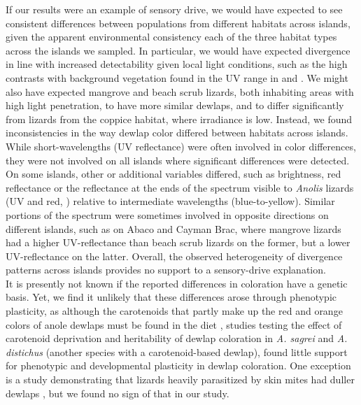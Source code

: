 If our results were an example of sensory drive, we would have expected to see consistent differences between populations from different habitats across islands, given the apparent environmental consistency each of the three habitat types across the islands we sampled. In particular, we would have expected divergence in line with increased detectability given local light conditions, such as the high contrasts with background vegetation found in the UV range in \citet{Leal2002} and \citet{Leal2004}. We might also have expected mangrove and beach scrub lizards, both inhabiting areas with high light penetration, to have more similar dewlaps, and to differ significantly from lizards from the coppice habitat, where irradiance is low. Instead, we found inconsistencies in the way dewlap color differed between habitats across islands. While short-wavelengths (UV reflectance) were often involved in color differences, they were not involved on all islands where significant differences were detected. On some islands, other or additional variables differed, such as brightness, red reflectance or the reflectance at the ends of the spectrum visible to \textit{Anolis} lizards (UV and red, \citealt{Lazareva2012}) relative to intermediate wavelengths (blue-to-yellow). Similar portions of the spectrum were sometimes involved in opposite directions on different islands, such as on Abaco and Cayman Brac, where mangrove lizards had a higher UV-reflectance than beach scrub lizards on the former, but a lower UV-reflectance on the latter. Overall, the observed heterogeneity of divergence patterns across islands provides no support to a sensory-drive explanation.\\

It is presently not known if the reported differences in coloration have a genetic basis. Yet, we find it unlikely that these differences arose through phenotypic plasticity, as although the carotenoids that partly make up the red and orange colors of anole dewlaps must be found in the diet \citep{Goodwin1984, Hill2002, Hill2006}, studies testing the effect of carotenoid deprivation \citep{Steffen2010, Ng2013} and heritability \citep{Cox2017} of dewlap coloration in \textit{A. sagrei} and \textit{A. distichus} (another species with a carotenoid-based dewlap), found little support for phenotypic and developmental plasticity in dewlap coloration. One exception is a study demonstrating that lizards heavily parasitized by skin mites had duller dewlaps \citep{Cook2013}, but we found no sign of that in our study.\\

